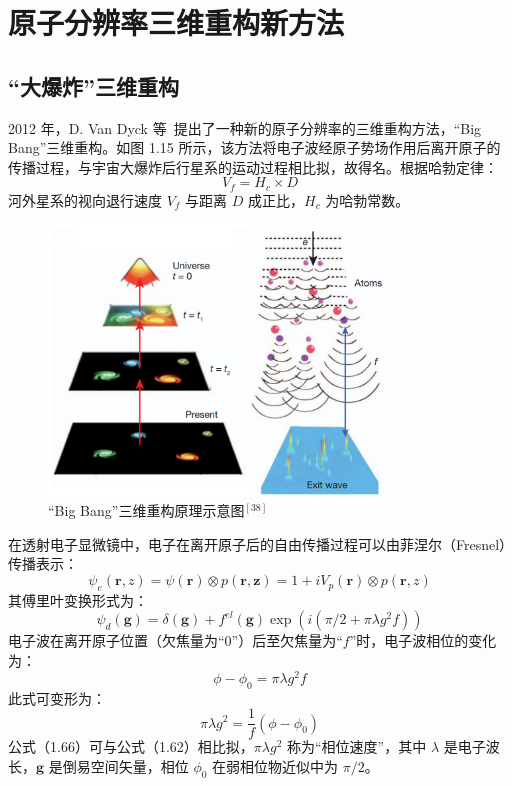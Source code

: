 \section{原子分辨率三维重构新方法}
\subsection{“大爆炸”三维重构}
2012 年，D. Van Dyck 等~\cite{VanDyck2012}提出了一种新的原子分辨率的三维重构方法，“Big Bang”三维重构。如图 1.15 所示，该方法将电子波经原子势场作用后离开原子的传播过程，与宇宙大爆炸后行星系的运动过程相比拟，故得名。根据哈勃定律：
\begin{equation}
V_f = H_c \times D
\end{equation}
河外星系的视向退行速度 $V_f$ 与距离 $D$ 成正比，$H_c$ 为哈勃常数。
\begin{figure}[htbp]
	\vspace{\baselineskip}
	\centering
	\includegraphics[width=0.8\textwidth]{../1.13/1_13}
	\caption{“Big Bang”三维重构原理示意图$^{[38]}$}\label{fig:113}
\end{figure}


在透射电子显微镜中，电子在离开原子后的自由传播过程可以由菲涅尔（Fresnel）传播表示：
\begin{equation}
\psi_e(\boldsymbol{r},z)=\psi(\boldsymbol{r})\otimes p(\boldsymbol{r,z}) = 1+iV_p(\boldsymbol{r})\otimes p(\boldsymbol{r},z)
\end{equation}
其傅里叶变换形式为：
\begin{equation}
\psi_d(\boldsymbol{g})=\delta(\boldsymbol{g})+f^{el}(\boldsymbol{g})\exp\left(i\left(\pi/2+\pi \lambda g^2f\right)\right)
\end{equation}
电子波在离开原子位置（欠焦量为“0”）后至欠焦量为“$f$”时，电子波相位的变化为：
\begin{equation}
\phi -\phi_0 = \pi \lambda g^2 f
\end{equation}
此式可变形为：
\begin{equation}
\pi \lambda g^2 = \frac{1}{f}(\phi-\phi_0)
\end{equation}
公式（1.66）可与公式（1.62）相比拟，$\pi \lambda g^2$ 称为“相位速度”，其中 $\lambda$ 是电子波长，$\boldsymbol{g}$ 是倒易空间矢量，相位 $\phi_0$ 在弱相位物近似中为 $\pi/2$。


